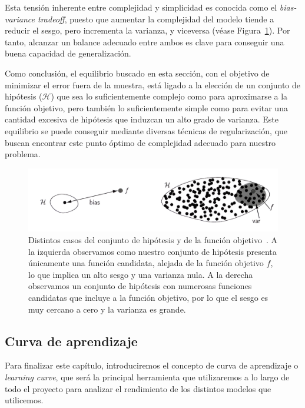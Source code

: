 Esta tensión inherente entre complejidad y simplicidad es conocida como el \textit{bias-variance tradeoff}, puesto que aumentar la complejidad del modelo tiende a reducir el sesgo, pero incrementa la varianza, y viceversa (véase Figura~\ref{fig:bias-variance}). Por tanto, alcanzar un balance adecuado entre ambos es clave para conseguir una buena capacidad de generalización.

Como conclusión, el equilibrio buscado en esta sección, con el objetivo de minimizar el error fuera de la muestra, está ligado a la elección de un conjunto de hipótesis ($\mathcal{H}$) que sea lo suficientemente complejo como para aproximarse a la función objetivo, pero también lo suficientemente simple como para evitar una cantidad excesiva de hipótesis que induzcan un alto grado de varianza. Este equilibrio se puede conseguir mediante diversas técnicas de regularización, que buscan encontrar este punto óptimo de complejidad adecuado para nuestro problema.


\begin{figure}[h]
    \centering
    \includegraphics[width=0.7\linewidth]{img/bias-variance.png}
    \caption[Distintos casos del conjunto de hipótesis y de la función objetivo.] {Distintos casos del conjunto de hipótesis y de la función objetivo~\cite{Mostafa2012}. A la izquierda observamos como nuestro conjunto de hipótesis presenta únicamente una función candidata, alejada de la función objetivo $f$, lo que implica un alto sesgo y una varianza nula. A la derecha observamos un conjunto de hipótesis con numerosas funciones candidatas que incluye a la función objetivo, por lo que el sesgo es muy cercano a cero y la varianza es grande.}\label{fig:bias-variance}
\end{figure}

\subsection{Curva de aprendizaje}

Para finalizar este capítulo, introduciremos el concepto de curva de aprendizaje o \emph{learning curve}, que será la principal herramienta que utilizaremos a lo largo de todo el proyecto para analizar el rendimiento de los distintos modelos que utilicemos.

